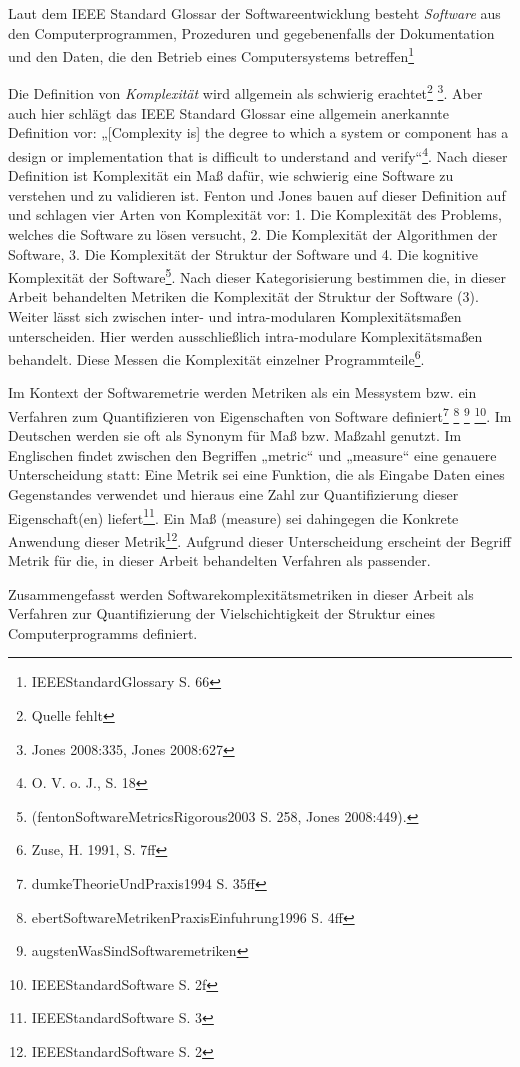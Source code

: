Laut dem IEEE Standard Glossar der Softwareentwicklung besteht
\emph{Software} aus den Computerprogrammen, Prozeduren und
gegebenenfalls der Dokumentation und den Daten, die den Betrieb eines
Computersystems betreffen\footnote{IEEEStandardGlossary S. 66}

Die Definition von \emph{Komplexität} wird allgemein als schwierig
erachtet\footnote{Quelle fehlt} \footnote{Jones 2008:335, Jones 2008:627}.
Aber auch hier schlägt das IEEE Standard Glossar eine allgemein
anerkannte Definition vor: „{[}Complexity is{]} the degree to which a
system or component has a design or implementation that is difficult to
understand and verify``\footnote{O. V. o. J., S. 18}. Nach dieser
Definition ist Komplexität ein Maß dafür, wie schwierig eine Software zu
verstehen und zu validieren ist. Fenton und Jones bauen auf dieser
Definition auf und schlagen vier Arten von Komplexität vor: 1. Die
Komplexität des Problems, welches die Software zu lösen versucht, 2. Die
Komplexität der Algorithmen der Software, 3. Die Komplexität der
Struktur der Software und 4. Die kognitive Komplexität der
Software\footnote{(fentonSoftwareMetricsRigorous2003 S. 258, Jones
  2008:449).}. Nach dieser Kategorisierung bestimmen die, in dieser
Arbeit behandelten Metriken die Komplexität der Struktur der Software
(3). Weiter lässt sich zwischen inter- und intra-modularen
Komplexitätsmaßen unterscheiden. Hier werden ausschließlich
intra-modulare Komplexitätsmaßen behandelt. Diese Messen die Komplexität
einzelner Programmteile\footnote{Zuse, H. 1991, S. 7ff}.

Im Kontext der Softwaremetrie werden Metriken als ein Messystem bzw. ein
Verfahren zum Quantifizieren von Eigenschaften von Software
definiert\footnote{dumkeTheorieUndPraxis1994 S. 35ff} \footnote{ebertSoftwareMetrikenPraxisEinfuhrung1996
  S. 4ff} \footnote{augstenWasSindSoftwaremetriken} \footnote{IEEEStandardSoftware
  S. 2f}. Im Deutschen werden sie oft als Synonym für Maß bzw. Maßzahl
genutzt. Im Englischen findet zwischen den Begriffen „metric`` und
„measure`` eine genauere Unterscheidung statt: Eine Metrik sei eine
Funktion, die als Eingabe Daten eines Gegenstandes verwendet und hieraus
eine Zahl zur Quantifizierung dieser Eigenschaft(en) liefert\footnote{IEEEStandardSoftware
  S. 3}. Ein Maß (measure) sei dahingegen die Konkrete Anwendung dieser
Metrik\footnote{IEEEStandardSoftware S. 2}. Aufgrund dieser
Unterscheidung erscheint der Begriff Metrik für die, in dieser Arbeit
behandelten Verfahren als passender.

Zusammengefasst werden Softwarekomplexitätsmetriken in dieser Arbeit als
Verfahren zur Quantifizierung der Vielschichtigkeit der Struktur eines
Computerprogramms definiert.

